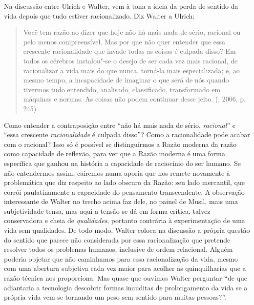 Na discussão entre Ulrich e Walter, vem à tona a ideia da perda de
sentido da vida depois que tudo estiver racionalizado. Diz Walter a
Ulrich:

\begin{quote}
Você tem razão ao dizer que hoje não há mais nada de sério, racional ou
pelo menos compreensível. Mas por que não quer entender que essa
crescente racionalidade que invade todas as coisas é culpada disso? Em
todos os cérebros instalou"-se o desejo de ser cada vez mais racional, de
racionalizar a vida mais do que nunca, torná-la mais especializada; e,
ao mesmo tempo, a incapacidade de imaginar o que será de nós quando
tivermos tudo entendido, analisado, classificado, transformado em
máquinas e normas. As coisas não podem continuar desse jeito. (,
2006, p. 245)
\end{quote}

Como entender a contraposição entre ``não há mais nada de sério,
\emph{racional}'' e ``essa crescente \emph{racionalidade} é culpada
disso''? Como a racionalidade pode acabar com o racional? Isso só é
possível se distinguirmos a Razão moderna da razão como capacidade de
reflexão, para ver que a Razão moderna é uma forma específica que ganhou
na história a capacidade de raciocínio do ser humano. Se não entendermos
assim, cairemos numa aporia que nos remete novamente à problemática que
diz respeito ao lado obscuro da Razão: seu lado mercantil, que corrói
paulatinamente a capacidade do pensamento transcendente. A observação
interessante de Walter no trecho acima faz dele, no painel de Musil,
mais uma subjetividade tensa, mas aqui a tensão se dá em forma crítica,
talvez conservadora e cheia de \emph{qualidades}, portanto contrária à
experimentação de uma vida sem qualidades. De todo modo, Walter coloca
na discussão a própria questão do sentido que parece não considerada por
essa racionalização que pretende resolver todos os problemas humanos,
inclusive de ordem relacional. Alguém poderia objetar que não caminhamos
para essa racionalização da vida, mesmo com uma abertura subjetiva cada
vez maior para acolher as quinquilharias que a razão técnica nos
proporciona. Mas quase que ouvimos Walter perguntar ``de que adiantaria
a tecnologia descobrir formas inauditas de prolongamento da vida se a
própria vida vem se tornando um peso sem sentido para muitas pessoas?''.

